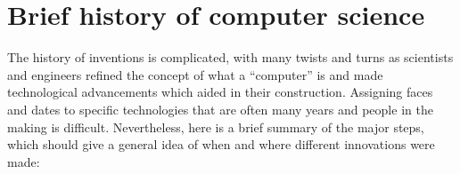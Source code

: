 \section{Brief history of computer science}

The history of inventions is complicated, with many twists and turns as scientists and engineers refined the concept of what a ``computer'' is and made technological advancements which aided in their construction. Assigning faces and dates to specific technologies that are often many years and people in the making is difficult. 
Nevertheless, here is a brief summary of the major steps, which should give a general idea of when and where different innovations were made:

